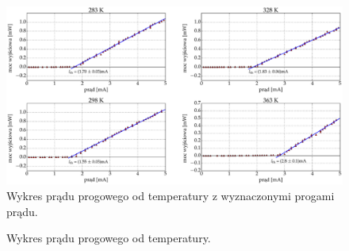 \begin{figure}
\center
  \includegraphics[scale=0.30]{plot_vcsel_850/plot_fit_i_th.eps}
  \caption{Wykres prądu progowego od temperatury z wyznaczonymi progami prądu.}
  \label{fig:rys5}
\end{figure}
\begin{figure}
\center
  
  \caption{Wykres prądu progowego od temperatury.}
  \label{fig:rys6}
\end{figure}
